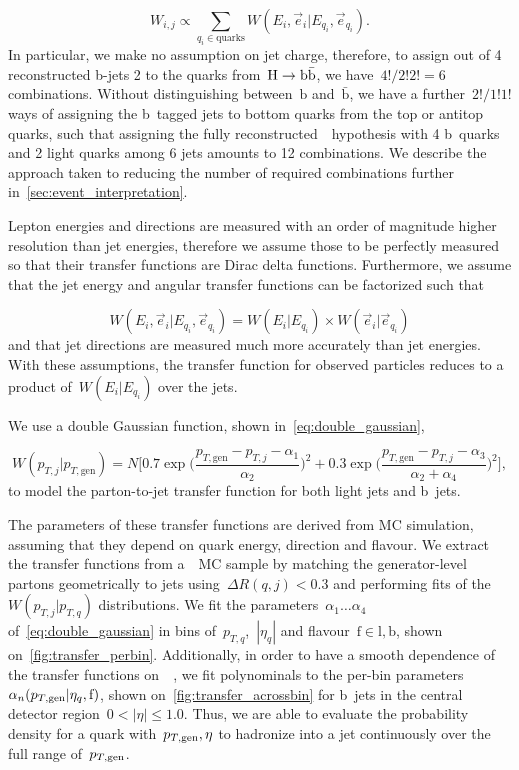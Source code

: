 \begin{equation}
\label{eq:tf_combination_sum}
W_{i,j} \propto \sum_{q_i \in \mathrm{quarks}} W(E_i, \vec{e}_i | E_{q_i}, \vec{e}_{q_i}).
\end{equation}
In particular, we make no assumption on jet charge, therefore, to assign out of 4 reconstructed b-jets 2 to the quarks from~$\mathrm{H} \rightarrow \mathrm{b}\bar{\mathrm{b}}$, we have~$4!/2!2! = 6$ combinations. Without distinguishing between~$\mathrm{b}$ and~$\bar{\mathrm{b}}$, we have a further~$2!/1!1!$ ways of assigning the b~tagged jets to bottom quarks from the top or antitop quarks, such that assigning the fully reconstructed~\ttHbb~hypothesis with 4 b~quarks and 2 light quarks among 6 jets amounts to 12 combinations. We describe the approach taken to reducing the number of required combinations further in~\cref{sec:event_interpretation}.

Lepton energies and directions are measured with an order of magnitude higher resolution than jet energies, therefore we assume those to be perfectly measured so that their transfer functions are Dirac delta functions.
Furthermore, we assume that the jet energy and angular transfer functions can be factorized such that

\begin{equation}
W(E_i, \vec{e}_i | E_{q_i}, \vec{e}_{q_i}) = W(E_i | E_{q_i}) \times W(\vec{e}_i | \vec{e}_{q_i})
\end{equation}
and that jet directions are measured much more accurately than jet energies.
With these assumptions, the transfer function for observed particles reduces to a product of~$W(E_i | E_{q_i})$ over the jets.

We use a double Gaussian function, shown in~\cref{eq:double_gaussian},

\begin{equation}
\label{eq:double_gaussian}
W(p_{T,j} | p_{T,\mathrm{gen}}) = N \biggl[0.7\exp{\biggl(\frac{p_{T,\mathrm{gen}} - p_{T,j} - \alpha_1}{\alpha_2}\biggr)^2} + 0.3\exp{\biggl(\frac{p_{T,\mathrm{gen}} - p_{T,j} - \alpha_3}{\alpha_2+\alpha_4}\biggr)^2}\biggr],
\end{equation}
to model the parton-to-jet transfer function for both light jets and b~jets.

The parameters of these transfer functions are derived from MC simulation, assuming that they depend on quark energy, direction and flavour. We extract the transfer functions from a~\ttbar~MC sample by matching the generator-level partons geometrically to jets using~$\Delta R(q,j) < 0.3$ and performing fits of the~$W(p_{T,j}|p_{T,q})$ distributions. We fit the parameters~$\alpha_1 \dots \alpha_4$ of~\cref{eq:double_gaussian} in bins of~$p_{T,q}$,~$|\eta_{q}|$ and flavour~$\mathrm{f}\in{\mathrm{l}, \mathrm{b}}$, shown on~\cref{fig:transfer_perbin}. Additionally, in order to have a smooth dependence of the transfer functions on~\ptgen~, we fit polynominals to the per-bin parameters~$\alpha_n(p_{T,\mathrm{gen}}|\eta_{q},\mathrm{f})$, shown on~\cref{fig:transfer_acrossbin} for b~jets in the central detector region~$0 < |\eta| \le 1.0$. Thus, we are able to evaluate the probability density for a quark with~$p_{T,\mathrm{gen}},\eta$ to hadronize into a jet continuously over the full range of~$p_{T,\mathrm{gen}}$.

